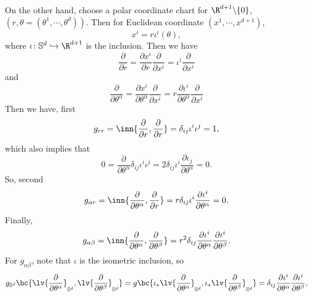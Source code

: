 \begin{enumerate}[label=\arabic{*}.]
    On the other hand, choose a polar coordinate chart for $\R^{d+1} \backslash \{0\}$, $(r,\theta=(\theta^1,\cdots,\theta^d))$. Then for Euclidean coordinate $(x^1,\cdots,x^{d+1})$,
    \begin{equation*}
        x^i = r \iota^i(\theta),
    \end{equation*}
    where $\iota \colon \mathbb{S}^d \hookrightarrow \R^{d+1}$ is the inclusion. Then we have
    \begin{equation*}
        \frac{\partial}{\partial r} = \frac{\partial x^i}{\partial r}\frac{\partial}{\partial x^i} = \iota^i\frac{\partial}{\partial x^i}
    \end{equation*}
    and 
    \begin{equation*}
        \frac{\partial}{\partial \theta^\alpha} = \frac{\partial x^i}{\partial \theta^\alpha}\frac{\partial}{\partial x^i} = r\frac{\partial \iota^i}{\partial \theta^\alpha} \frac{\partial}{\partial x^i}
    \end{equation*}
    Then we have, first
    \begin{equation*}
        g_{rr} = \inn{\frac{\partial}{\partial r},\frac{\partial}{\partial r}} = \delta_{ij}\iota^i\iota^j = 1,
    \end{equation*}
    which also implies that
    \begin{equation*}
        0 = \frac{\partial}{\partial \theta^\alpha} \delta_{ij}\iota^i\iota^j = 2 \delta_{ij}\iota^i\frac{\partial \iota_j}{\partial \theta^\alpha} = 0.
    \end{equation*}
    So, second
    \begin{equation*}
        g_{\alpha r} = \inn{\frac{\partial}{\partial \theta^\alpha}, \frac{\partial}{\partial r}} = r\delta_{ij}\iota^i\frac{\partial \iota^i}{\partial \theta^\alpha} = 0.
    \end{equation*}
    Finally,
    \begin{equation*}
        g_{\alpha \beta} = \inn{\frac{\partial}{\partial \theta^\alpha},\frac{\partial}{\partial \theta^\beta}} = r^2\delta_{ij}\frac{\partial \iota^i}{\partial \theta^\alpha} \frac{\partial \iota^i}{\partial \theta^\beta}.
    \end{equation*}
    For $g_{\alpha \beta}$, note that $\iota$ is the isometric inclusion, so
    \begin{equation*}
        g_{\mathbb{S}^d}\bc{\lv{\frac{\partial}{\partial \theta^\alpha}}_{\mathbb{S}^d},\lv{\frac{\partial}{\partial \theta^\beta}}_{\mathbb{S}^d}} = g\bc{\iota_*\lv{\frac{\partial}{\partial \theta^\alpha}}_{\mathbb{S}^d},\iota_*\lv{\frac{\partial}{\partial \theta^\beta}}_{\mathbb{S}^d}} = \delta_{ij}\frac{\partial \iota^i}{\partial \theta^\alpha} \frac{\partial \iota^i}{\partial \theta^\beta},

\end{equation*}
\end{enumerate}
